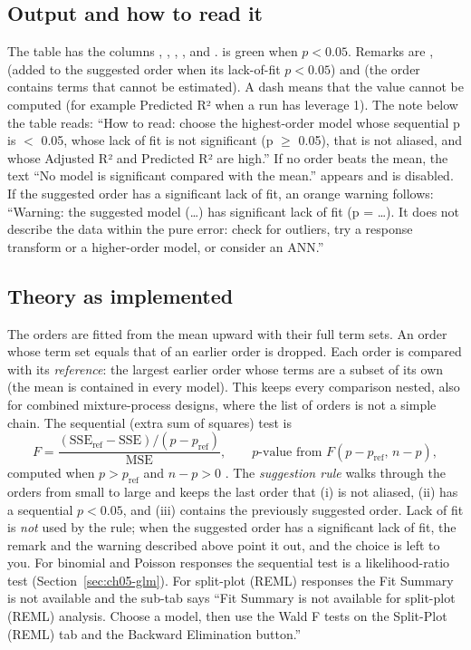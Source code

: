 \subsection*{Output and how to read it}
The table has the columns , , , ,
 and .  is green when $p<0.05$. Remarks are ,
 (added to the suggested order when its lack-of-fit $p<0.05$) and  (the
order contains terms that cannot be estimated). A dash means that the value cannot be
computed (for example Predicted R² when a run has leverage 1). The note below the table reads:
``How to read: choose the highest-order model whose sequential p is $<$ 0.05, whose lack of fit is not
significant (p $\ge$ 0.05), that is not aliased, and whose Adjusted R² and Predicted R² are high.'' If no
order beats the mean, the text ``No model is significant compared with the mean.'' appears and
 is disabled. If the suggested order has a significant lack of fit, an orange warning
follows: ``Warning: the suggested model (\dots) has significant lack of fit (p = \dots). It does not describe the
data within the pure error: check for outliers, try a response transform or a higher-order model, or consider an
ANN.''

\subsection*{Theory as implemented}
The orders are fitted from the mean upward with their full term sets. An order whose term set equals that
of an earlier order is dropped. Each order is compared with its \emph{reference}: the largest earlier order
whose terms are a subset of its own (the mean is contained in every model). This keeps every comparison
nested, also for combined mixture-process designs, where the list of orders is not a simple chain. The
sequential (extra sum of squares) test is
\begin{equation}
  F=\frac{(\text{SSE}_{\text{ref}}-\text{SSE})/(p-p_{\text{ref}})}{\text{MSE}},\qquad
  p\text{-value from } F(p-p_{\text{ref}},\,n-p),
  \label{eq:ch05-seqF}
\end{equation}
computed when $p>p_{\text{ref}}$ and $n-p>0$ \citep{montgomery2017}. The \emph{suggestion rule} walks
through the orders from small to large and keeps the last order that (i) is not aliased, (ii) has a
sequential $p<0.05$, and (iii) contains the previously suggested order. Lack of fit is \emph{not} used by
the rule; when the suggested order has a significant lack of fit, the remark and the warning described above point
it out, and the choice is left to you. For binomial and Poisson responses the
sequential test is a likelihood-ratio test (Section~\ref{sec:ch05-glm}). For split-plot (REML) responses
the Fit Summary is not available and the sub-tab says ``Fit Summary is not available for split-plot (REML)
analysis. Choose a model, then use the Wald F tests on the Split-Plot (REML) tab and the Backward
Elimination button.''

